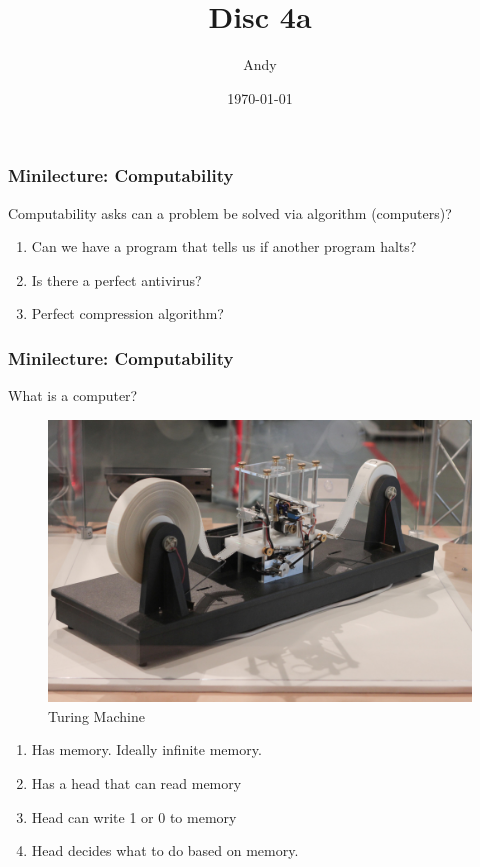 \documentclass{beamer}
\title{Disc 4a}
\author{Andy}
\institute{UC Berkeley}
\date{\today}
\begin{document}
\begin{frame}
  \titlepage
\end{frame}

\begin{frame}
  \frametitle{Minilecture: Computability}

    \begin{definition}
      Computability asks can a problem be solved via algorithm (computers)?
    \end{definition}


    \begin{enumerate}[<+->]
      \item Can we have a program that tells us if another program halts?
      \item Is there a perfect antivirus?
      \item Perfect compression algorithm?
    \end{enumerate}

\end{frame}

\begin{frame}
  \frametitle{Minilecture: Computability}

    What is a computer?
  
    \begin{figure}
      \includegraphics[scale=0.125]{turing.jpg}
      \caption{Turing Machine}
    \end{figure}

    \begin{enumerate}[<+->]
      \item Has memory. Ideally infinite memory.
      \item Has a head that can read memory
      \item Head can write 1 or 0 to memory
      \item Head decides what to do based on memory.
     \end{enumerate}
     

\end{frame}
\end{document}
